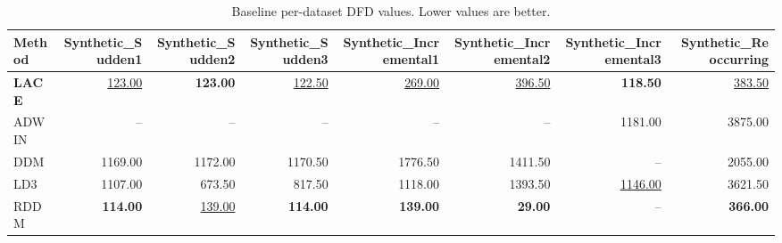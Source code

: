 \begin{table}
\caption{Baseline per-dataset DFD values. Lower values are better.}
\label{tab:per-data-baseline-delay-for-detection}
\begin{tabular}{lrrrrrrr}
\toprule
Method & Synthetic\_Sudden1 & Synthetic\_Sudden2 & Synthetic\_Sudden3 & Synthetic\_Incremental1 & Synthetic\_Incremental2 & Synthetic\_Incremental3 & Synthetic\_Reoccurring \\
\midrule
\textbf{LACE} & \underline{123.00} & \textbf{123.00} & \underline{122.50} & \underline{269.00} & \underline{396.50} & \textbf{118.50} & \underline{383.50} \\
ADWIN & -- & -- & -- & -- & -- & 1181.00 & 3875.00 \\
DDM & 1169.00 & 1172.00 & 1170.50 & 1776.50 & 1411.50 & -- & 2055.00 \\
LD3 & 1107.00 & 673.50 & 817.50 & 1118.00 & 1393.50 & \underline{1146.00} & 3621.50 \\
RDDM & \textbf{114.00} & \underline{139.00} & \textbf{114.00} & \textbf{139.00} & \textbf{29.00} & -- & \textbf{366.00} \\
\bottomrule
\end{tabular}
\end{table}
